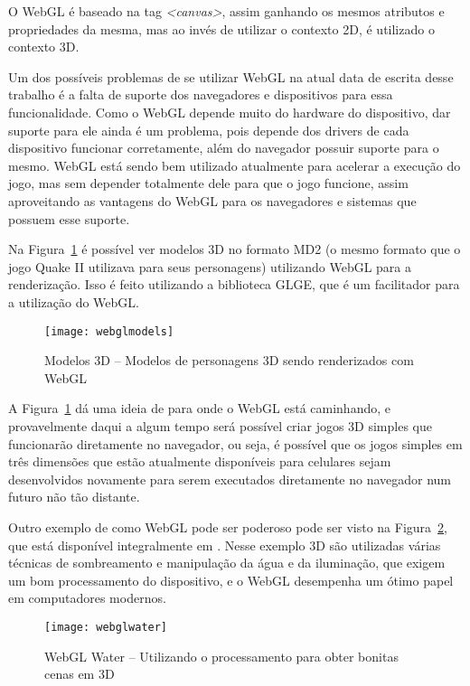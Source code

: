 O WebGL é baseado na tag \textit{<canvas>}, assim ganhando os mesmos
atributos e propriedades da mesma, mas ao invés de utilizar o contexto
2D, é utilizado o contexto 3D.

Um dos possíveis problemas de se utilizar WebGL na atual data
de escrita desse trabalho é a falta de suporte dos navegadores e
dispositivos para essa funcionalidade. Como o WebGL depende muito do
hardware do dispositivo, dar suporte para ele ainda é um problema,
pois depende dos drivers de cada dispositivo funcionar
corretamente, além do navegador possuir suporte para o mesmo.
WebGL está sendo bem utilizado atualmente para acelerar a execução do jogo,
mas sem depender totalmente dele para que o jogo funcione, assim
aproveitando as vantagens do WebGL para os navegadores e sistemas que
possuem esse suporte.

Na Figura~\ref{img:webglmodels} é possível ver modelos 3D no formato
MD2 (o mesmo formato que o jogo Quake II utilizava para seus
personagens) utilizando WebGL para a renderização. Isso é feito utilizando a
biblioteca GLGE, que é um facilitador para a utilização do WebGL.

\begin{figure}[H]
  \centering
	\texttt{[image: webglmodels]}
  \caption{Modelos 3D {--} Modelos de personagens 3D sendo renderizados com WebGL}
  \label{img:webglmodels}
\end{figure}

A Figura~\ref{img:webglmodels} dá uma ideia de para onde o WebGL está
caminhando, e provavelmente daqui a algum tempo será possível criar
jogos 3D simples que funcionarão diretamente no navegador, ou seja,
é possível que os jogos simples em três dimensões que estão atualmente
disponíveis para celulares sejam desenvolvidos novamente para
serem executados diretamente no navegador num futuro não tão distante.

Outro exemplo de como WebGL pode ser poderoso pode ser visto na
Figura~\ref{img:webglwater},
que está disponível integralmente em .
Nesse exemplo 3D são utilizadas várias técnicas de sombreamento e
manipulação da água e da iluminação, que exigem um bom processamento
do dispositivo, e o WebGL desempenha um ótimo papel em computadores
modernos.

\begin{figure}[H]
  \centering
	\texttt{[image: webglwater]}
  \caption{WebGL Water {--} Utilizando o processamento para obter
  bonitas cenas em 3D}
  \label{img:webglwater}
\end{figure}

